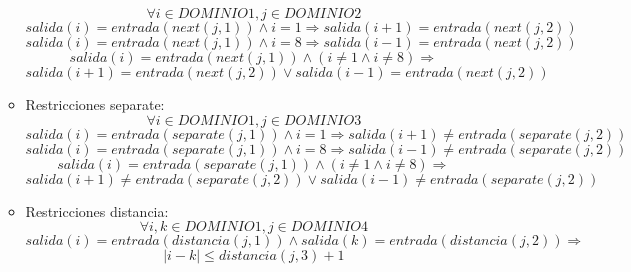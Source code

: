 \documentclass[12pt]{article}
\begin{document}
\begin{itemize}
\begin{itemize}
\begin{equation*}
\forall i \in DOMINIO1, j \in DOMINIO2
\end{equation*}
\begin{equation*}
salida(i) = entrada(next(j,1)) \land i = 1 \Rightarrow salida(i+1) = entrada(next(j,2))
\end{equation*}
\begin{equation*}
salida(i) = entrada(next(j,1)) \land i = 8 \Rightarrow salida(i-1) = entrada(next(j,2))
\end{equation*}
\begin{equation*}
salida(i) = entrada(next(j,1)) \land (i \neq 1 \land i \neq 8) \Rightarrow
\end{equation*}
\begin{equation*}
salida(i+1) = entrada(next(j,2)) \lor salida(i-1) = entrada(next(j,2))
\end{equation*}
\item Restricciones separate:
\begin{equation*}
\forall i \in DOMINIO1, j \in DOMINIO3
\end{equation*}
\begin{equation*}
salida(i) = entrada(separate(j,1)) \land i = 1 \Rightarrow salida(i+1) \neq entrada(separate(j,2))
\end{equation*}
\begin{equation*}
salida(i) = entrada(separate(j,1)) \land i = 8 \Rightarrow salida(i-1) \neq entrada(separate(j,2))
\end{equation*}
\begin{equation*}
salida(i) = entrada(separate(j,1)) \land (i \neq 1 \land i \neq 8) \Rightarrow
\end{equation*}
\begin{equation*}
salida(i+1) \neq entrada(separate(j,2)) \lor salida(i-1) \neq entrada(separate(j,2))
\end{equation*}
\item Restricciones distancia:
\begin{equation*}
\forall i,k \in DOMINIO1, j \in DOMINIO4
\end{equation*}
\begin{equation*}
salida(i) = entrada(distancia(j,1)) \land salida(k) = entrada(distancia(j,2)) \Rightarrow
\end{equation*}
\begin{equation*}
|i-k| \leq distancia(j,3)+1
\end{equation*}
\end{itemize}
\end{itemize}
\end{document}
